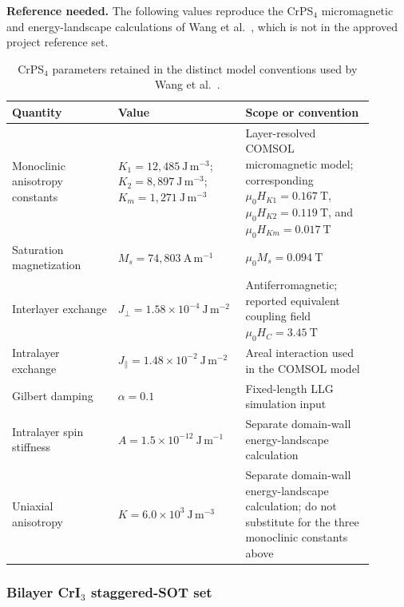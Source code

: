 \textbf{Reference needed.}  The following values reproduce the CrPS$_4$
micromagnetic and energy-landscape calculations of Wang et
al.~\cite{wang2026stoner-afm}, which is not in the approved project reference
set.

\begin{table}[htbp]
    \centering
    \small
    \renewcommand{\arraystretch}{1.12}
    \begin{tabular}{p{0.29\linewidth}p{0.27\linewidth}p{0.34\linewidth}}
        \hline
        Quantity & Value & Scope or convention \\
        \hline
        Monoclinic anisotropy constants
            & $K_1=12{,}485\ \mathrm{J\,m^{-3}}$;
              $K_2=8{,}897\ \mathrm{J\,m^{-3}}$;
              $K_m=1{,}271\ \mathrm{J\,m^{-3}}$
            & Layer-resolved COMSOL micromagnetic model; corresponding
              $\mu_0H_{K1}=0.167\ \mathrm{T}$,
              $\mu_0H_{K2}=0.119\ \mathrm{T}$, and
              $\mu_0H_{Km}=0.017\ \mathrm{T}$ \\
        Saturation magnetization
            & $M_s=74{,}803\ \mathrm{A\,m^{-1}}$
            & $\mu_0M_s=0.094\ \mathrm{T}$ \\
        Interlayer exchange
            & $J_\perp=1.58\times10^{-4}\ \mathrm{J\,m^{-2}}$
            & Antiferromagnetic; reported equivalent coupling field
              $\mu_0H_C=3.45\ \mathrm{T}$ \\
        Intralayer exchange
            & $J_\parallel=1.48\times10^{-2}\ \mathrm{J\,m^{-2}}$
            & Areal interaction used in the COMSOL model \\
        Gilbert damping
            & $\alpha=0.1$
            & Fixed-length LLG simulation input \\
        Intralayer spin stiffness
            & $A=1.5\times10^{-12}\ \mathrm{J\,m^{-1}}$
            & Separate domain-wall energy-landscape calculation \\
        Uniaxial anisotropy
            & $K=6.0\times10^{3}\ \mathrm{J\,m^{-3}}$
            & Separate domain-wall energy-landscape calculation; do not
              substitute for the three monoclinic constants above \\
        \hline
    \end{tabular}
    \caption{CrPS$_4$ parameters retained in the distinct model conventions
        used by Wang et al.~\cite{wang2026stoner-afm}.}
    \label{tab:crps4-parameters}
\end{table}

\subsubsection{Bilayer CrI$_3$ staggered-SOT set}

